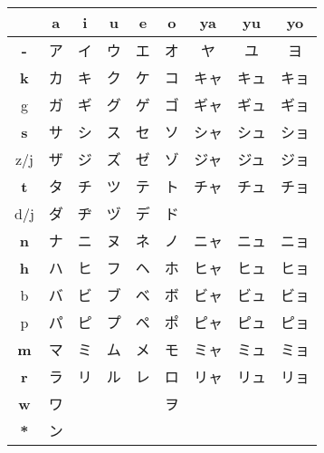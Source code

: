 

\begin{center}
\begin{tabular}{c||c|c|c|c|c||c|c|c|}
&
\textbf{\large a}&\textbf{\large i}&\textbf{\large u}&\textbf{\large e}&\textbf{\large o}&
\textbf{\small ya}&\textbf{\small yu}&\textbf{\small yo}\\\hline\hline

\textbf{\large -}  &ア &イ &ウ &エ &オ &ヤ   &ユ   &ヨ   \\ \hline
\textbf{\large k}  &カ &キ &ク &ケ &コ &キャ &キュ &キョ \\
{\small g}         &ガ &ギ &グ &ゲ &ゴ &ギャ &ギュ &ギョ \\ \hline
\textbf{\large s}  &サ &シ &ス &セ &ソ &シャ &シュ &ショ \\
{\small z/j}       &ザ &ジ &ズ &ゼ &ゾ &ジャ &ジュ &ジョ \\ \hline
\textbf{\large t}  &タ &チ &ツ &テ &ト &チャ &チュ &チョ \\
{\small d/j}       &ダ &ヂ &ヅ &デ &ド &     &     &     \\ \hline
\textbf{\large n}  &ナ &ニ &ヌ &ネ &ノ &ニャ &ニュ &ニョ \\ \hline
\textbf{\large h}  &ハ &ヒ &フ &ヘ &ホ &ヒャ &ヒュ &ヒョ \\
{\small b}         &バ &ビ &ブ &ベ &ボ &ビャ &ビュ &ビョ \\
{\small p}         &パ &ピ &プ &ペ &ポ &ピャ &ピュ &ピョ \\ \hline
\textbf{\large m}  &マ &ミ &ム &メ &モ &ミャ &ミュ &ミョ \\ \hline
\textbf{\large r}  &ラ &リ &ル &レ &ロ &リャ &リュ &リョ \\ \hline
\textbf{\large w}  &ワ &   &   &   &ヲ &     &     &     \\ \hline
\textbf{\large {*}}&ン &   &   &   &   &     &     &     \\ \hline

\end{tabular}
\end{center}
